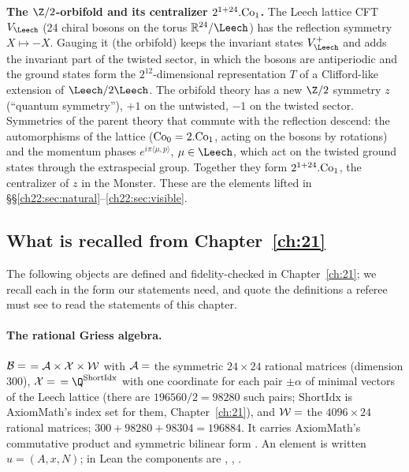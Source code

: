 \begin{physics}
\textbf{The $\Z/2$-orbifold and its centralizer $2^{1+24}.\mathrm{Co}_1$.}  The Leech lattice CFT $V_\Leech$
(24 chiral bosons on the torus $\mathbb{R}^{24}/\Leech$) has the reflection symmetry $X\mapsto-X$.  Gauging it (the orbifold)
keeps the invariant states $V_\Leech^+$ and adds the invariant part of the twisted sector, in which the bosons are
antiperiodic and the ground states form the $2^{12}$-dimensional representation $T$ of a Clifford-like extension
of $\Leech/2\Leech$.  The orbifold theory has a new $\Z/2$ symmetry $z$ (``quantum symmetry''), $+1$ on the
untwisted, $-1$ on the twisted sector.  Symmetries of the parent theory that commute with the reflection descend:
the automorphisms of the lattice ($\mathrm{Co}_0=2.\mathrm{Co}_1$, acting on the bosons by rotations) and
the momentum phases $e^{i\pi\langle\mu,p\rangle}$, $\mu\in\Leech$, which act on the twisted ground states through the
extraspecial group.  Together they form $2^{1+24}.\mathrm{Co}_1$, the centralizer of $z$ in the Monster.  These
are the elements lifted in \S\S\ref{ch22:sec:natural}--\ref{ch22:sec:visible}.
\end{physics}

\subsection{What is recalled from Chapter~\ref{ch:21}}\label{ch22:sec:recall}

The following objects are defined and fidelity-checked in Chapter~\ref{ch:21}; we recall each in the form our
statements need, and quote the definitions a referee must see to read the statements of this chapter.

\paragraph{The rational Griess algebra.}  $\mathcal{B}=$  $=\mathcal{A}\times\mathcal{X}\times
\mathcal{W}$ with $\mathcal{A}=$  the symmetric $24\times24$ rational matrices (dimension $300$),
$\mathcal{X}=$  $=\Q^{\mathrm{ShortIdx}}$ with one coordinate for each pair $\pm\alpha$ of minimal
vectors of the Leech lattice (there are $196560/2=98280$ such pairs; $\mathrm{ShortIdx}$ is AxiomMath's index set for
them, Chapter~\ref{ch:21}), and $\mathcal{W}=$ 
the $4096\times24$ rational matrices; $300+98280+98304=196884$.  It carries AxiomMath's commutative product
 and symmetric bilinear form .  An element is written $u=(A,x,N)$; in Lean the components
are , , .

